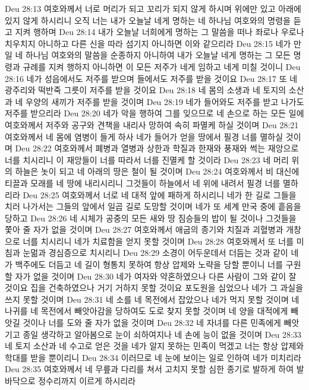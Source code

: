 Deu 28:13  여호와께서 너로 머리가 되고 꼬리가 되지 않게 하시며 위에만 있고 아래에 있지 않게 하시리니 오직 너는 내가 오늘날 네게 명하는 네 하나님 여호와의 명령을 듣고 지켜 행하며
Deu 28:14  내가 오늘날 너희에게 명하는 그 말씀을 떠나 좌로나 우로나 치우치지 아니하고 다른 신을 따라 섬기지 아니하면 이와 같으리라
Deu 28:15  네가 만일 네 하나님 여호와의 말씀을 순종하지 아니하여 내가 오늘날 네게 명하는 그 모든 명령과 규례를 지켜 행하지 아니하면 이 모든 저주가 네게 임하고 네게 미칠 것이니
Deu 28:16  네가 성읍에서도 저주를 받으며 들에서도 저주를 받을 것이요
Deu 28:17  또 네 광주리와 떡반죽 그릇이 저주를 받을 것이요
Deu 28:18  네 몸의 소생과 네 토지의 소산과 네 우양의 새끼가 저주를 받을 것이며
Deu 28:19  네가 들어와도 저주를 받고 나가도 저주를 받으리라
Deu 28:20  네가 악을 행하여 그를 잊으므로 네 손으로 하는 모든 일에 여호와께서 저주와 공구와 견책을 내리사 망하여 속히 파멸케 하실 것이며
Deu 28:21  여호와께서 네 몸에 염병이 들게 하사 네가 들어가 얻을 땅에서 필경 너를 멸하실 것이며
Deu 28:22  여호와께서 폐병과 열병과 상한과 학질과 한재와 풍재와 썩는 재앙으로 너를 치시리니 이 재앙들이 너를 따라서 너를 진멸케 할 것이라
Deu 28:23  네 머리 위의 하늘은 놋이 되고 네 아래의 땅은 철이 될 것이며
Deu 28:24  여호와께서 비 대신에 티끌과 모래를 네 땅에 내리시리니 그것들이 하늘에서 네 위에 내려서 필경 너를 멸하리라
Deu 28:25  여호와께서 너로 네 대적 앞에 패하게 하시리니 네가 한 길로 그들을 치러 나가서는 그들의 앞에서 일곱 길로 도망할 것이며 네가 또 세계 만국 중에 흩음을 당하고
Deu 28:26  네 시체가 공중의 모든 새와 땅 짐승들의 밥이 될 것이나 그것들을 쫓아 줄 자가 없을 것이며
Deu 28:27  여호와께서 애굽의 종기와 치질과 괴혈병과 개창으로 너를 치시리니 네가 치료함을 얻지 못할 것이며
Deu 28:28  여호와께서 또 너를 미침과 눈멂과 경심증으로 치시리니
Deu 28:29  소경이 어두운데서 더듬는 것과 같이 네가 백주에도 더듬고 네 길이 형통치 못하여 항상 압제와 노략을 당할 뿐이니 너를 구원 할 자가 없을 것이며
Deu 28:30  네가 여자와 약혼하였으나 다른 사람이 그와 같이 잘 것이요 집을 건축하였으나 거기 거하지 못할 것이요 포도원을 심었으나 네가 그 과실을 쓰지 못할 것이며
Deu 28:31  네 소를 네 목전에서 잡았으나 네가 먹지 못할 것이며 네 나귀를 네 목전에서 빼앗아감을 당하여도 도로 찾지 못할 것이며 네 양을 대적에게 빼앗길 것이나 너를 도와 줄 자가 없을 것이며
Deu 28:32  네 자녀를 다른 민족에게 빼앗기고 종일 생각하고 알아봄으로 눈이 쇠하여지나 네 손에 능이 없을 것이며
Deu 28:33  네 토지 소산과 네 수고로 얻은 것을 네가 알지 못하는 민족이 먹겠고 너는 항상 압제와 학대를 받을 뿐이리니
Deu 28:34  이러므로 네 눈에 보이는 일로 인하여 네가 미치리라
Deu 28:35  여호와께서 네 무릎과 다리를 쳐서 고치지 못할 심한 종기로 발하게 하여 발바닥으로 정수리까지 이르게 하시리라
